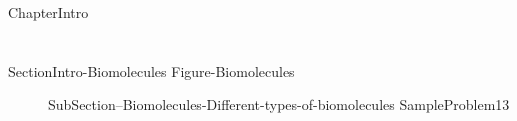 \documentclass[main.tex]{subfiles}
\newcommand\chapterlabel{Ch-biochemistry}\setcounter{figurenewcounter}{0}\setcounter{tablenewcounter}{0}\setcounter{formulanewcounter}{0}\chapterpicture{../{\chapterlabel}/figure1}\chapterpicturelabel{PxFuel}
\begin{document}
  \iftoggle{chem121}{}{
 \setcounter{chapter}{10}{ChapterName}  
}
 \iftoggle{chem121}{
 \setcounter{chapter}{11} {ChapterName}  
}{}  


 {ChapterIntro}

%
%


\section{\color{blue!30!black}{Biomolecules}}
{SectionIntro-Biomolecules}
{Figure-Biomolecules}
\sloppy\begin{description}
\item[] {SubSection--Biomolecules-Different-types-of-biomolecules}
{SampleProblem13}
\end{description}
\end{document}
